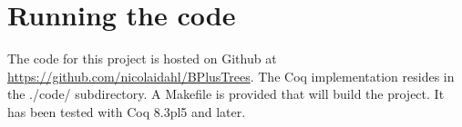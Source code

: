 \appendix
\label{sec:Appendix}
\section{Running the code}
The code for this project is hosted on Github at \url{https://github.com/nicolaidahl/BPlusTrees}. The Coq implementation resides in the ./code/ subdirectory. A Makefile is provided that will build the project. It has been tested with Coq 8.3pl5 and later.
